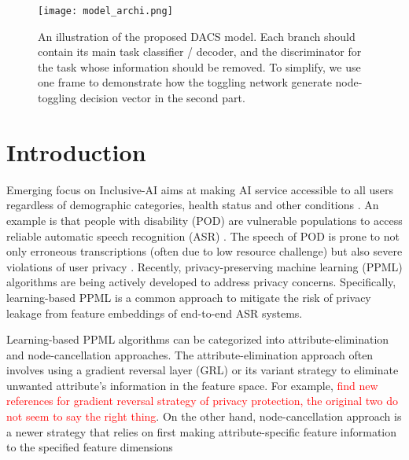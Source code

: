 \documentclass[lettersize,journal]{IEEEtran}
\begin{document}
\begin{figure*}
\centerline{\texttt{[image: model\_archi.png]}}
\caption{An illustration of the proposed DACS model. Each branch should contain its main task classifier / decoder, and the discriminator for the task whose information should be removed. To simplify, we use one frame to demonstrate how the toggling network generate node-toggling decision vector in the second part.}
\label{fig:MdlArchi}
\end{figure*}

\section{Introduction}
Emerging focus on Inclusive-AI aims at making AI service accessible to all users regardless of demographic categories, health status and other conditions \cite{avellan2020ai}. An example is that people with disability (POD) are vulnerable populations to access reliable automatic speech recognition (ASR) \cite{srinivasan2022ssncse_nlp,guo2020toward}. The speech of POD is prone to not only erroneous transcriptions (often due to low resource challenge) but also severe violations of user privacy \cite{williams2023new}. Recently, privacy-preserving machine learning (PPML) algorithms are being actively developed to address privacy concerns. Specifically, learning-based PPML is a common approach to mitigate the risk of privacy leakage from feature embeddings of end-to-end ASR systems.




Learning-based PPML algorithms can be categorized into attribute-elimination and node-cancellation approaches. The attribute-elimination approach often involves using a gradient reversal layer (GRL) or its variant strategy to eliminate unwanted attribute's information in the feature space. For example, \textcolor{red}{find new references for gradient reversal strategy of privacy protection, the original two do not seem to say the right thing}. On the other hand, node-cancellation approach is a newer strategy that relies on first making attribute-specific feature information to the specified feature dimensions
\end{document}
